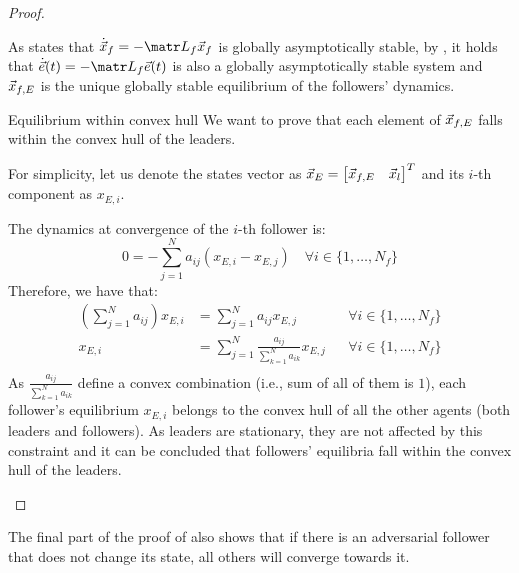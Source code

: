 \begin{theorem}[Containment]
\begin{proof}
\begin{descriptionlist}
                As  states that $\dot{\x}_f = -\lap_f \x_f$ is globally asymptotically stable, by , it holds that $\dot{\vec{e}}(t) = -\lap_f \vec{e}(t)$ is also a globally asymptotically stable system and ${\vec{x}}_{f,E}$ is the unique globally stable equilibrium of the followers' dynamics.

            \item[Equilibrium within convex hull] 
                We want to prove that each element of ${\vec{x}}_{f,E}$ falls within the convex hull of the leaders.

                For simplicity, let us denote the states vector as ${\vec{x}}_E = \begin{bmatrix} {\vec{x}}_{f,E} & {\vec{x}}_l \end{bmatrix}^T$ and its $i$-th component as $x_{E,i}$.

                The dynamics at convergence of the $i$-th follower is:
                \[ 0 = - \sum_{j=1}^N a_{ij} (x_{E,i} - x_{E,j}) \quad \forall i \in \{ 1, \dots, N_f \} \]
                Therefore, we have that:
                \[
                    \begin{aligned}
                        \left( \sum_{j=1}^N a_{ij} \right) x_{E,i} &= \sum_{j=1}^N a_{ij} x_{E,j} & & \forall i \in \{ 1, \dots, N_f \} \\
                        x_{E,i} &= \sum_{j=1}^N \frac{a_{ij}}{\sum_{k=1}^N a_{ik}} x_{E,j} & & \forall i \in \{ 1, \dots, N_f \} \\
                    \end{aligned}
                \]
                As $\frac{a_{ij}}{\sum_{k=1}^N a_{ik}}$ define a convex combination (i.e., sum of all of them is $1$), each follower's equilibrium $x_{E,i}$ belongs to the convex hull of all the other agents (both leaders and followers). As leaders are stationary, they are not affected by this constraint and it can be concluded that followers' equilibria fall within the convex hull of the leaders.
        \end{descriptionlist}
    \end{proof}
\end{theorem}

\begin{remark}
    The final part of the proof of  also shows that if there is an adversarial follower that does not change its state, all others will converge towards it.
\end{remark}